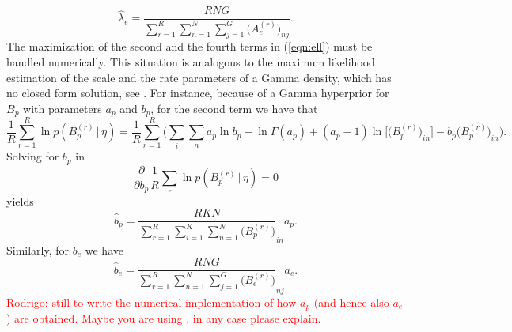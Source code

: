 \documentclass[11pt]{amsart}
\theoremstyle{definition}
\theoremstyle{remark}
\begin{document}
\[
  \widehat\lambda_e = \frac{RNG}{\sum_{r=1}^R \sum_{n=1}^N
    \sum_{j=1}^G \big(A_e^{(r)}\big)_{nj}}.
\]
The maximization of the second and the fourth terms in (\ref{eqn:ell})
must be handled numerically. This situation is analogous to the
maximum likelihood estimation of the scale and the rate parameters of
a Gamma density, which has no closed form solution, see \cite{CW}. For
instance, because of a Gamma hyperprior for $B_p$ with parameters
$a_p$ and $b_p$, for the second term we have that
\[
   \frac{1}{R}\sum_{r=1}^R \ln p(B_p^{(r)}\,|\, \eta)
  =
   \frac{1}{R}\sum_{r=1}^R \bigg(\sum_{i}\sum_{n} a_p\ln b_p  
    - \ln\Gamma(a_p) + 
   (a_p-1)\ln\big[\big(B_p^{(r)}\big)_{in}\big] -  
    b_p\big(B_p^{(r)}\big)_{in}\bigg).
\]
Solving for $b_p$ in 
\[
  \frac{\partial}{\partial b_p}
   \frac{1}{R}\sum_r \ln p(B_p^{(r)}\,|\, \eta) = 0
\]
yields
\[
   \hat b_p = \frac{RKN}{\sum_{r=1}^R \sum_{i=1}^K \sum_{n=1}^N 
     \big(B_p^{(r)}\big)}_{in}  a_p.
\]
Similarly, for $b_e$ we have
\[
   \hat b_e = \frac{RNG}{\sum_{r=1}^R \sum_{n=1}^N  \sum_{j=1}^G 
     \big(B_e^{(r)}\big)}_{nj}  a_e.
\]
\textcolor{red}{Rodrigo: still to write the numerical implementation
of how $a_p$ (and hence also $a_e$) are obtained. Maybe you are using
\cite{J}, in any case please explain.}
\end{document}
